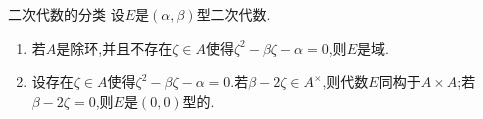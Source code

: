 \begin{proposition}{二次代数的分类}{}
	设$E$是$\left(\alpha,\beta\right)$型二次代数.
	\begin{enumerate}
		\item 若$A$是除环,并且不存在$\zeta\in A$使得$\zeta^{2}-\beta\zeta-\alpha=0$,则$E$是域.
		\item 设存在$\zeta\in A$使得$\zeta^{2}-\beta\zeta-\alpha=0$.若$\beta-2\zeta\in A^{\times}$,则代数$E$同构于$A\times A$;若$\beta-2\zeta=0$,则$E$是$\left(0,0\right)$型的.
	\end{enumerate}
\end{proposition}












































































